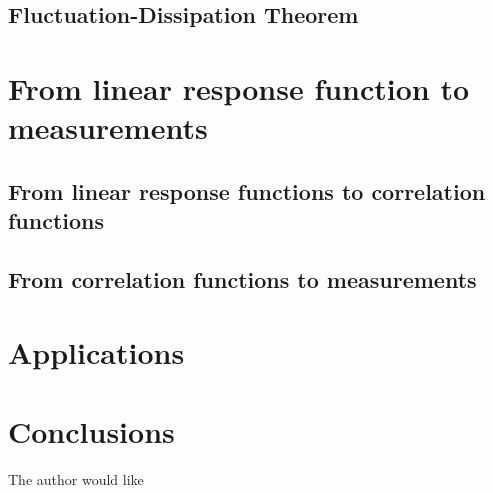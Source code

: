 \documentclass[reprint,
nofootinbib,
amsmath,amssymb,
aps]{revtex4-1}
\begin{document}
\subsection{Fluctuation-Dissipation Theorem}

\section{From linear response function to measurements}

\subsection{From linear response functions to correlation functions}

\subsection{From correlation functions to measurements}


\section{Applications}

\section{Conclusions}

\begin{acknowledgments}
	The author would like 
\end{acknowledgments}



%  
\end{document}
